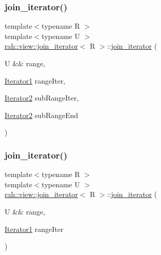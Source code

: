 \subsubsection{\texorpdfstring{join\_iterator()}{join\_iterator()}\hspace{0.1cm}{\footnotesize\ttfamily [1/2]}}
{\footnotesize\ttfamily template$<$typename R $>$ \\
template$<$typename U $>$ \\
\mbox{\hyperlink{structrah_1_1view_1_1join__iterator}{rah\+::view\+::join\+\_\+iterator}}$<$ R $>$\+::\mbox{\hyperlink{structrah_1_1view_1_1join__iterator}{join\+\_\+iterator}} (\begin{DoxyParamCaption}\item[{U \&\&}]{range,  }\item[{\mbox{\hyperlink{structrah_1_1view_1_1join__iterator_a8b71c6f25eee2915e2a8afc6e024196d}{Iterator1}}}]{range\+Iter,  }\item[{\mbox{\hyperlink{structrah_1_1view_1_1join__iterator_ae03a066174f3422c70d0e3c22e68d9f7}{Iterator2}}}]{sub\+Range\+Iter,  }\item[{\mbox{\hyperlink{structrah_1_1view_1_1join__iterator_ae03a066174f3422c70d0e3c22e68d9f7}{Iterator2}}}]{sub\+Range\+End }\end{DoxyParamCaption})\hspace{0.3cm}{\ttfamily [inline]}}

\mbox{\label{structrah_1_1view_1_1join__iterator_a2ba7e5d1fd1ea1e786ca894fe96ffeb4}} 
\subsubsection{\texorpdfstring{join\_iterator()}{join\_iterator()}\hspace{0.1cm}{\footnotesize\ttfamily [2/2]}}
{\footnotesize\ttfamily template$<$typename R $>$ \\
template$<$typename U $>$ \\
\mbox{\hyperlink{structrah_1_1view_1_1join__iterator}{rah\+::view\+::join\+\_\+iterator}}$<$ R $>$\+::\mbox{\hyperlink{structrah_1_1view_1_1join__iterator}{join\+\_\+iterator}} (\begin{DoxyParamCaption}\item[{U \&\&}]{range,  }\item[{\mbox{\hyperlink{structrah_1_1view_1_1join__iterator_a8b71c6f25eee2915e2a8afc6e024196d}{Iterator1}}}]{range\+Iter }\end{DoxyParamCaption})\hspace{0.3cm}{\ttfamily [inline]}}



